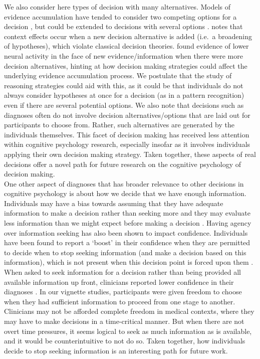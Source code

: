 \documentclass[a4paper, nobind]{templates/ociamthesis}
\begin{document}
We also consider here types of decision with many alternatives. Models of evidence accumulation have tended to consider two competing options for a decision \autocite{mcmillen_dynamics_2006}, but could be extended to decisions with several options \autocite{brown_observing_2009}. \textcite{trueblood2022} notes that context effects occur when a new decision alternative is added (i.e.~a broadening of hypotheses), which violate classical decision theories. \textcite{churchland2012} found evidence of lower neural activity in the face of new evidence/information when there were more decision alternatives, hinting at how decision making strategies could affect the underlying evidence accumulation process. We postulate that the study of reasoning strategies could aid with this, as it could be that individuals do not always consider hypotheses at once for a decision (as in a pattern recognition) even if there are several potential options. We also note that decisions such as diagnoses often do not involve decision alternatives/options that are laid out for participants to choose from. Rather, such alternatives are generated by the individuals themselves. This facet of decision making has received less attention within cognitive psychology research, especially insofar as it involves individuals applying their own decision making strategy. Taken together, these aspects of real decisions offer a novel path for future research on the cognitive psychology of decision making.\\

One other aspect of diagnoses that has broader relevance to other decisions in cognitive psychology is about how we decide that we have enough information. Individuals may have a bias towards assuming that they have adequate information to make a decision rather than seeking more \autocite{gehlbach_illusion_2024} and they may evaluate less information than we might expect before making a decision \autocite{klein_people_2018}. Having agency over information seeking has also been shown to impact confidence. Individuals have been found to report a `boost' in their confidence when they are permitted to decide when to stop seeking information (and make a decision based on this information), which is not present when this decision point is forced upon them \autocite{wei_confidence_2021}. When asked to seek information for a decision rather than being provided all available information up front, clinicians reported lower confidence in their diagnoses \autocite{gruppen_information_1991}. In our vignette studies, participants were given freedom to choose when they had sufficient information to proceed from one stage to another. Clinicians may not be afforded complete freedom in medical contexts, where they may have to make decisions in a time-critical manner. But when there are not overt time pressures, it seems logical to seek as much information as is available, and it would be counterintuitive to not do so. Taken together, how individuals decide to stop seeking information is an interesting path for future work.\\
\end{document}
